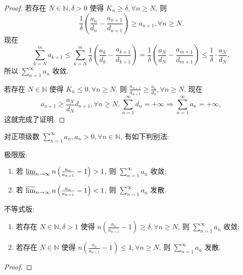 \documentclass[../../main.tex]{subfiles}
\begin{document}
\begin{proof}
若存在 \( N \in \mathbb{N}, \delta > 0 \) 使得 \( K_n \geqslant \delta, \forall n \geqslant N \), 则
\[
\frac{1}{\delta} \left( \frac{a_n}{d_n} - \frac{a_{n + 1}}{d_{n + 1}} \right) \geqslant a_{n + 1}, \forall n \geqslant N.
\]
现在
\[
\sum_{k=N}^m a_{k + 1} \leqslant \sum_{k=N}^m \frac{1}{\delta} \left( \frac{a_k}{d_k} - \frac{a_{k + 1}}{d_{k + 1}} \right) = \frac{1}{\delta} \left( \frac{a_N}{d_N} - \frac{a_{m + 1}}{d_{m + 1}} \right) \leqslant \frac{1}{\delta} \cdot \frac{a_N}{d_N},
\]
所以 \( \sum_{n=1}^\infty a_n \) 收敛.

若存在 \( N \in \mathbb{N} \) 使得 \( K_n \leqslant 0, \forall n \geqslant N \). 则 \( \frac{a_{n + 1}}{d_{n + 1}} \geqslant \frac{a_n}{d_n}, \forall n \geqslant N \). 现在
\[
a_{n + 1} \geqslant \frac{a_N}{d_N} d_{n + 1}, \forall n \geqslant N, \sum_{n=1}^\infty d_n = +\infty \Rightarrow \sum_{n=1}^\infty a_n = +\infty,
\]
这就完成了证明.
\end{proof}

\begin{theorem}[拉比判别法]\label{theorem:拉比判别法}
对正项级数 \( \sum_{n=1}^\infty a_n, a_n > 0, \forall n \in \mathbb{N} \), 有如下判别法:

极限版:
\begin{enumerate}
\item 若 \( \varliminf_{n \to \infty} n \left( \frac{a_n}{a_{n + 1}} - 1 \right) > 1 \), 则 \( \sum_{n=1}^\infty a_n \) 收敛;
\item 若 \( \varlimsup_{n \to \infty} n \left( \frac{a_n}{a_{n + 1}} - 1 \right) < 1 \), 则 \( \sum_{n=1}^\infty a_n \) 发散.
\end{enumerate}

不等式版:
\begin{enumerate}
\item 若存在 \( N \in \mathbb{N}, \delta > 1 \) 使得 \( n \left( \frac{a_n}{a_{n + 1}} - 1 \right) \geqslant \delta, \forall n \geqslant N \), 则 \( \sum_{n=1}^\infty a_n \) 收敛;
\item 若存在 \( N \in \mathbb{N} \) 使得 \( n \left( \frac{a_n}{a_{n + 1}} - 1 \right) \leqslant 1, \forall n \geqslant N \), 则 \( \sum_{n=1}^\infty a_n \) 发散.
\end{enumerate}
\end{theorem}
\begin{proof}

\end{proof}
\end{document}
